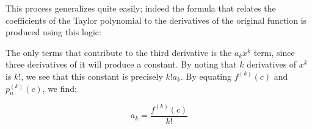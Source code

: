 \documentclass{ximera}
\begin{document}
\begin{exercise}
\begin{exercise}
\begin{exercise}
\begin{exercise}
\begin{exercise}
This process generalizes quite easily; indeed the formula that relates the coefficients of the Taylor polynomial to the derivatives of the original function is produced using this logic:

\begin{image}
  \end{image}

The only terms that contribute to the third derivative is the $a_kx^k$ term, since three derivatives of it will produce a constant.  By noting that $k$ derivatives of $x^k$ is $k!$, we see that this constant is precisely $k!a_k$.  By equating $f^{(k)}(c)$ and $p_n^{(k)}(c)$, we find:

\[
a_k = \frac{f^{(k)}(c)}{k!}
\]


\end{exercise}

\end{exercise}
\end{exercise}
\end{exercise}
\end{exercise}
\end{document}
